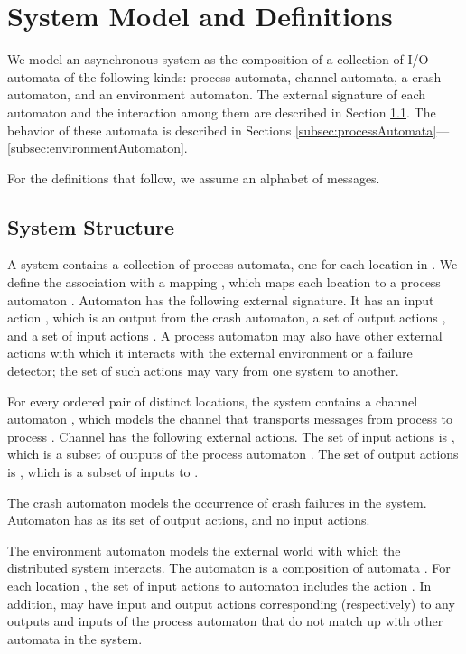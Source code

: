 \documentclass[11pt]{article}
\numberwithin{theorem}{section}
\begin{document}
\section{System Model and Definitions}
\label{sec:systemModel}

We model an asynchronous system as the composition of a collection of
I/O automata of the following kinds:  process automata, channel
automata, a crash automaton, and an environment automaton.
The external signature of each automaton and the interaction among
them are described in Section \ref{subsec:systemInteraction}. 
The behavior of these automata is described in Sections
\ref{subsec:processAutomata}---\ref{subsec:environmentAutomaton}. 

For the definitions that follow, we assume an alphabet 
of messages.

\subsection{System Structure}
\label{subsec:systemInteraction}

A system contains a collection of process automata, one for each
location in .
We define the association with a mapping , which maps each
location  to a process automaton .
Automaton  has the following external signature. 
It has an input action , which is an output from the crash
automaton,  
a set of output actions , 
and a set of input actions .  
A process automaton may also have other external actions with which it
interacts with the external environment or a failure detector; the set
of such actions may vary from one system to another. 

For every ordered pair  of distinct locations, the system
contains a channel automaton , which models the channel that
transports messages from process  to process . 
Channel  has the following external actions. 
The set of input actions  is , which is a subset of outputs of the process automaton
.
The set of output actions  is , which is a subset of inputs to .

The crash automaton  models the occurrence of crash
failures in the system.
Automaton  has  as
its set of output actions, and no input actions.

The environment automaton  models the external world with
which the distributed system interacts. The automaton  is a composition of  automata .
For each location , the set of input actions to automaton  includes the action .
In addition,  may have input and output actions corresponding
(respectively) to any outputs and inputs of the process automaton  that
do not match up with other automata in the system.
\end{document}

